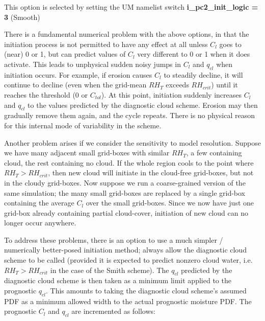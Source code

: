 \documentclass{UMDP_article}
\begin{document}
This option is selected by setting the UM namelist switch
{\bf i\_pc2\_init\_logic = 3} (Smooth)

There is a fundamental numerical problem with the above options, in that
the initiation process is not permitted to have any effect at all unless
$C_l$ goes to (near) 0 or 1, but can predict values of $C_l$ very different
to 0 or 1 when it does activate.  This leads to unphysical sudden noisy jumps
in $C_l$ and $q_{cl}$ when initiation occurs.
For example, if erosion causes $C_l$ to steadily decline, it will continue
to decline (even when the grid-mean $RH_T$ exceeds $RH_{crit}$) until
it reaches the threshold (0 or $C_{tol}$).  At this point, initiation suddenly
increases $C_l$ and $q_{cl}$ to the values predicted by the diagnostic cloud
scheme.  Erosion may then gradually remove them again, and the cycle repeats.
There is no physical reason for this internal mode of variability in the
scheme.

Another problem arises if we consider the sensitivity to model resolution.
Suppose we have many adjacent small grid-boxes with similar $RH_T$,
a few containing cloud, the rest containing no cloud.  If the whole
region cools to the point where $RH_T > RH_{crit}$, then new cloud
will initiate in the cloud-free grid-boxes, but not in the cloudy grid-boxes.
Now suppose we run a coarse-grained version of the same simulation;
the many small grid-boxes are replaced by a single grid-box containing the
average $C_l$ over the small grid-boxes.  Since we now have just one
grid-box already containing partial cloud-cover, initiation of new cloud
can no longer occur anywhere.

To address these problems, there is an option to use a much simpler /
numerically better-posed initiation method;
always allow the diagnostic cloud scheme to be called
(provided it is expected to predict nonzero cloud water,
i.e. $RH_T > RH_{crit}$ in the case of the Smith scheme).
The $q_{cl}$ predicted by the diagnostic cloud scheme is then taken
as a minimum limit applied to the prognostic $q_{cl}$.
This amounts to taking the diagnostic cloud scheme's assumed PDF as a minimum
allowed width to the actual prognostic moisture PDF.
The prognostic $C_l$ and $q_{cl}$ are incremented as follows:
\end{document}
